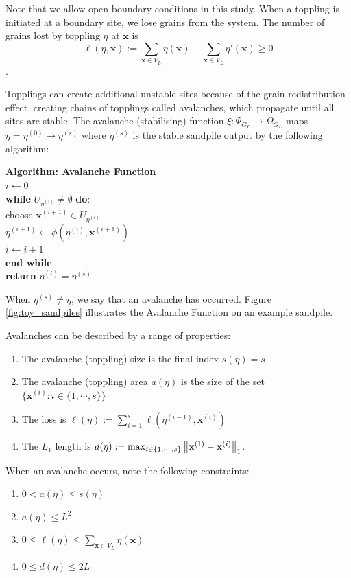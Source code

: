 Note that we allow open boundary conditions in this study. When a toppling is initiated at a boundary site, we lose grains from the system. The number of grains lost by toppling $\eta$ at $\mathbf{x}$ is \[\ell(\eta, \mathbf{x}) := \sum_{\mathbf{x} \in V_L} \eta(\mathbf{x}) - \sum_{\mathbf{x} \in V_L} \eta'(\mathbf{x}) \geq 0\].

Topplings can create additional unstable sites because of the grain redistribution effect, creating chains of topplings called avalanches, which propagate until all sites are stable. The avalanche (stabilising) function $\xi: \Psi_{G_L} \to \Omega_{G_L}$ maps $\eta = \eta^{(0)} \mapsto \eta^{(s)}$ where $\eta^{(s)}$ is the stable sandpile output by the following algorithm:

\underline{\textbf{Algorithm: Avalanche Function}} \\
$i \gets 0$ \\
\textbf{while} $U_{\eta^{(i)}} \neq \emptyset$ \textbf{do}:\\
choose $\mathbf{x}^{(i+1)} \in U_{\eta^{(i)}}$ \\
$\eta^{(i+1)} \gets \phi(\eta^{(i)}, \mathbf{x}^{(i+1)})$ \\
$i \gets i + 1$ \\
\textbf{end while} \\
\textbf{return} $\eta^{(i)} = \eta^{(s)}$

When $\eta^{(s)} \neq \eta$, we say that an avalanche has occurred. Figure \ref{fig:toy_sandpiles} illustrates the Avalanche Function on an example sandpile.

Avalanches can be described by a range of properties: 
\begin{enumerate}
    \item The avalanche (toppling) size is the final index $s(\eta) = s$
    \item The avalanche (toppling) area $a(\eta)$ is the size of the set $\{\mathbf{x}^{(i)}: i\in \{1, \cdots, s\}\}$
    \item The loss is $\ell(\eta) := \sum_{i=1}^{s} \ell(\eta^{(i-1)}, \mathbf{x}^{(i)})$
    \item The $L_1$ length is $d(\eta) := \max_{i\in\{1, \cdots, s\}}\left \lVert \mathbf{x}^{(1)} - \mathbf{x}^{(i)} \right \rVert_1$.
\end{enumerate} 

When an avalanche occurs, note the following constraints: 
\begin{enumerate}
    \item $0 < a(\eta) \leq s(\eta)$
    \item $a(\eta) \leq L^2$
    \item $0\leq \ell(\eta) \leq \sum_{\mathbf{x} \in V_L}\eta(\mathbf{x})$
    \item $0 \leq d(\eta) \leq 2L$
\end{enumerate}

